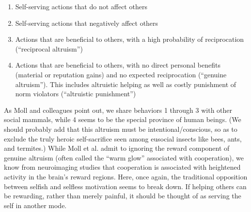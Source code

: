 \documentclass[a4paper,14pt]{extbook}
\begin{document}
\begin{enumerate}
      \item
            Self-serving actions that do not affect others
      \item
            Self-serving actions that negatively affect others
      \item
            Actions that are beneficial to others, with a high probability of reciprocation (``reciprocal altruism'')
      \item
            Actions that are beneficial to others, with no direct personal benefits (material or reputation gains) and no expected reciprocation (``genuine altruism'').
            This includes altruistic helping as well as costly punishment of norm violators (``altruistic punishment'')
\end{enumerate}

As Moll and colleagues point out, we share behaviors 1 through 3 with other social mammals, while 4 seems to be the special province of human beings.
(We should probably add that this altruism must be intentional/conscious, so as to exclude the truly heroic self-sacrifice seen among eusocial insects like bees, ants, and termites.)
While Moll et al. admit to ignoring the reward component of genuine altruism (often called the ``warm glow'' associated with cooperation), we know from neuroimaging studies that cooperation is associated with heightened activity in the brain's reward regions.
Here, once again, the traditional opposition between selfish and selfless motivation seems to break down.
If helping others can be rewarding, rather than merely painful, it should be thought of as serving the self in another mode.
\end{document}
